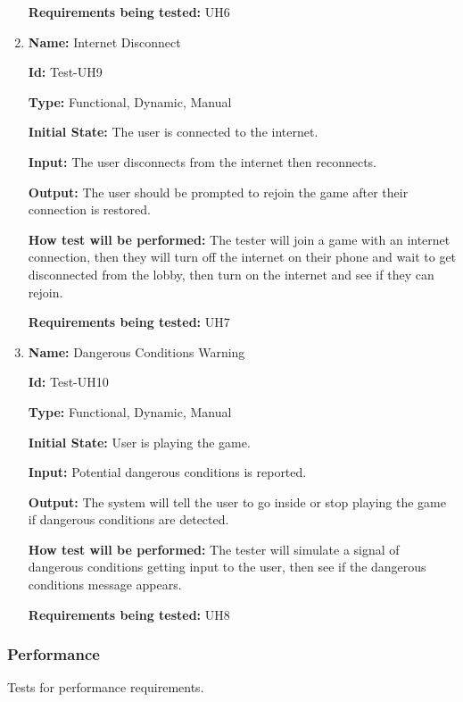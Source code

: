 \documentclass[12pt, titlepage]{article}
\begin{document}
\begin{enumerate}
\textbf{Requirements being tested:} UH6

\item{\textbf{Name: }Internet Disconnect }

\textbf{Id:} Test-UH9

\textbf{Type:} Functional, Dynamic, Manual
					
\textbf{Initial State:} The user is connected to the internet.
					
\textbf{Input:} The user disconnects from the internet then reconnects.
					
\textbf{Output:} The user should be prompted to rejoin the game after their connection is restored.
					
\textbf{How test will be performed:} The tester will join a game with an internet connection, then they will turn off the internet on their phone and wait to get disconnected from the lobby, then turn on the internet and see if they can rejoin.

\textbf{Requirements being tested:} UH7

\item{\textbf{Name: }Dangerous Conditions Warning }

\textbf{Id:} Test-UH10

\textbf{Type:} Functional, Dynamic, Manual
					
\textbf{Initial State:} User is playing the game.
					
\textbf{Input:} Potential dangerous conditions is reported.
					
\textbf{Output:} The system will tell the user to go inside or stop playing the game if dangerous conditions are detected.
					
\textbf{How test will be performed:} The tester will simulate a signal of dangerous conditions getting input to the user, then see if the dangerous conditions message appears.

\textbf{Requirements being tested:} UH8

\end{enumerate}

\subsubsection{Performance}
Tests for performance requirements.
\end{document}
